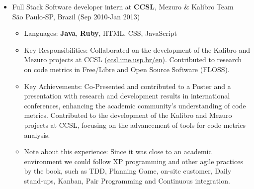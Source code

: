 \begin{itemize}
    \item \normalsize{Full Stack Software developer intern at \textbf{CCSL}, Mezuro \& Kalibro Team}\\
        \scriptsize{São Paulo-SP, Brazil (Sep 2010-Jan 2013)}
    \begin{itemize}
        \item \footnotesize{Languages:}\scriptsize{ \textbf{Java}, \textbf{Ruby}, HTML, CSS, JavaScript}
        \item \footnotesize{Key Responsibilities:}\scriptsize{ Collaborated on the development of the Kalibro and Mezuro projects at CCSL (\href{http://ccsl.ime.usp.br/en}{ccsl.ime.usp.br/en}). Contributed to research on code metrics in Free/Libre and Open Source Software (FLOSS).}
        \item \footnotesize{Key Achievements:}\scriptsize{ Co-Presented and contributed to a Poster and a presentation with research and development results in international conferences, enhancing the academic community's understanding of code metrics. Contributed to the development of the Kalibro and Mezuro projects at CCSL, focusing on the advancement of tools for code metrics analysis.}
        \item \footnotesize{Note about this experience:}\scriptsize{ Since it was close to an academic environment we could follow XP programming and other agile practices by the book, such as TDD, Planning Game, on-site customer, Daily stand-ups, Kanban, Pair Programming and Continuous integration.}
    \end{itemize}
\end{itemize}
